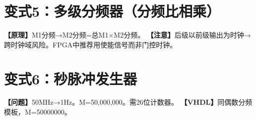 \section{变式5：多级分频器（分频比相乘）}

\begin{detailbox}[完整教学]
\textbf{【原理】}M1分频→M2分频=总M1×M2分频。
\textbf{【注意】}后级以前级输出为时钟→跨时钟域风险。FPGA中推荐用使能信号而非门控时钟。
\end{detailbox}


\section{变式6：秒脉冲发生器}

\begin{detailbox}[完整教学]
\textbf{【问题】}50MHz→1Hz。M=50,000,000。需26位计数器。
\textbf{【VHDL】}同偶数分频模板，M=50000000。
\end{detailbox}
